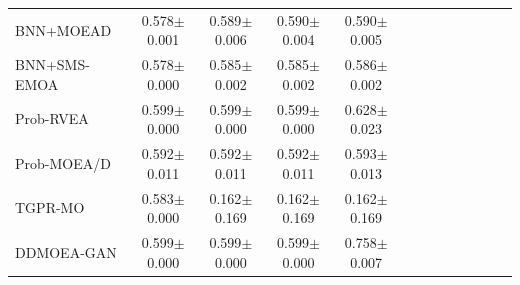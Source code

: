 \begin{table}[htbp]
{\begin{tabular}{l c c c c c c c c c c c c}
BNN+MOEAD & 0.578$\pm$0.001 & 0.589$\pm$0.006 & 0.590$\pm$0.004 & 0.590$\pm$0.005 &  &  &  &  &  &  &  &  \\
BNN+SMS-EMOA & 0.578$\pm$0.000 & 0.585$\pm$0.002 & 0.585$\pm$0.002 & 0.586$\pm$0.002 &  &  &  &  &  &  &  &  \\
Prob-RVEA & 0.599$\pm$0.000 & 0.599$\pm$0.000 & 0.599$\pm$0.000 & 0.628$\pm$0.023 &  &  &  &  &  &  &  &  \\
Prob-MOEA/D & 0.592$\pm$0.011 & 0.592$\pm$0.011 & 0.592$\pm$0.011 & 0.593$\pm$0.013 &  &  &  &  &  &  &  &  \\
TGPR-MO & 0.583$\pm$0.000 & 0.162$\pm$0.169 & 0.162$\pm$0.169 & 0.162$\pm$0.169 &  &  &  &  &  &  &  &  \\
DDMOEA-GAN & 0.599$\pm$0.000 & 0.599$\pm$0.000 & 0.599$\pm$0.000 & 0.758$\pm$0.007 &  &  &  &  &  &  &  &  \\
\hline
\end{tabular}
}
\end{table}
